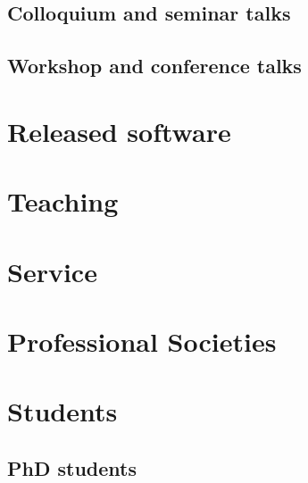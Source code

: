 \documentclass{article}
\begin{document}
\subsection*{Colloquium and seminar talks}



\subsection*{Workshop and conference talks}




\section*{Released software}



\section*{Teaching}




\section*{Service}




\section*{Professional Societies}




\section*{Students}

\subsection*{PhD students}
\end{document}
